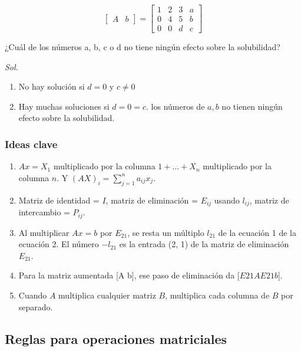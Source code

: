 \begin{enumerate}
	      \begin{equation*}
		      \begin{bmatrix}
			      A & b
		      \end{bmatrix}=\begin{bmatrix}
			      1 & 2 & 3 & a \\0&4&5&b\\ 0&0&d&c
		      \end{bmatrix}
	      \end{equation*}

	      ¿Cuál de los números a, b, c o d no tiene ningún efecto sobre la solubilidad?

	      \textit{Sol. }

	      \begin{enumerate}
		      \item No hay solución si $d =0$ y $c \neq 0$
		      \item Hay muchas soluciones si $d =0= c$. los números de $a, b$ no tienen ningún efecto sobre la solubilidad.
	      \end{enumerate}
\end{enumerate}


\subsubsection{Ideas clave}
\begin{enumerate}
	\item $Ax = X_1$ multiplicado por la columna $1 + \dots + X_n$ multiplicado por la columna $n$. Y $(AX)_{i} = \sum_{j=1}^{n} a_{ij} x_{j}$.
	\item Matriz de identidad = $I$, matriz de eliminación = $E_{ij}$ usando $l_{ij}$,
	      matriz de intercambio = $P_{ij}$.
	\item Al multiplicar $Ax = b$ por $E_{21}$, se resta un múltiplo $l_{21}$ de la ecuación 1 de la ecuación 2.
	      El número $-l_{21}$ es la entrada (2, 1) de la matriz de eliminación $E_{21}$.
	\item Para la matriz aumentada [A b], ese paso de eliminación da [$E21A E21b$].
	\item Cuando $A$ multiplica cualquier matriz $B$, multiplica cada columna de $B$ por separado.
\end{enumerate}

\subsection{Reglas para operaciones matriciales}

